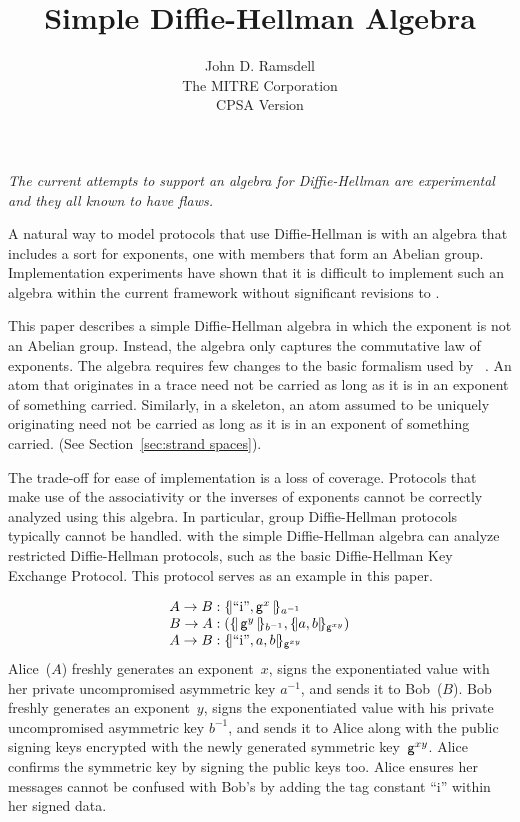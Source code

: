 \documentclass[12pt]{article}
\title{Simple Diffie-Hellman Algebra}
\author{John D. Ramsdell\\
  The MITRE Corporation\\ CPSA Version \version}
\newcommand{\gen}{\ensuremath{\cn{g}}}
\begin{document}
\maketitle
\cpsacopying

\emph{The current attempts to support an algebra for Diffie-Hellman
  are experimental and they all known to have flaws.}

A natural way to model protocols that use Diffie-Hellman is with an
algebra that includes a sort for exponents, one with members that form
an Abelian group.  Implementation experiments have shown that it is
difficult to implement such an algebra within the current {\cpsa}
framework without significant revisions to {\cpsa}.

This paper describes a simple Diffie-Hellman algebra in which the
exponent is not an Abelian group.  Instead, the algebra only captures
the commutative law of exponents.  The algebra requires few changes to
the basic formalism used by {\cpsa}~\cite{cpsaspec09}.  An atom that
originates in a trace need not be carried as long as it is in an
exponent of something carried.  Similarly, in a skeleton, an atom
assumed to be uniquely originating need not be carried as long as it
is in an exponent of something carried. (See Section~\ref{sec:strand
  spaces}).

The trade-off for ease of implementation is a loss of coverage.
Protocols that make use of the associativity or the inverses of
exponents cannot be correctly analyzed using this algebra.  In
particular, group Diffie-Hellman protocols typically cannot be
handled.  {\cpsa} with the simple Diffie-Hellman algebra can analyze
restricted Diffie-Hellman protocols, such as the basic Diffie-Hellman
Key Exchange Protocol.  This protocol serves as an example in this
paper.

$$\begin{array}{r@{{}:{}}l}
A\to B&\enc{\mbox{``i''}, \gen^x}{a^{-1}}\\
B\to A&(\enc{\gen^y}{b^{-1}}, \enc{a, b}{\gen^{xy}})\\
A\to B&\enc{\mbox{``i''}, a, b}{\gen^{xy}}
\end{array}$$
Alice~($A$) freshly generates an exponent~$x$, signs the exponentiated
value with her private uncompromised asymmetric key $a^{-1}$, and
sends it to Bob~($B$).  Bob freshly generates an exponent~$y$, signs
the exponentiated value with his private uncompromised asymmetric key
$b^{-1}$, and sends it to Alice along with the public signing keys
encrypted with the newly generated symmetric key~$\gen^{xy}$.  Alice
confirms the symmetric key by signing the public keys too.  Alice
ensures her messages cannot be confused with Bob's by adding the tag
constant ``i'' within her signed data.
\end{document}
